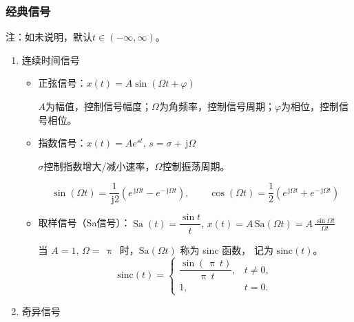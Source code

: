 \documentclass[UTF8,fontset=fandol,zihao=5]{ctexart}
\newcommand{\jj}{\,\mathrm{j}}
\newcommand{\ppi}{\,\uppi\,}
\begin{document}
\subsubsection{经典信号}

注：如未说明，默认$t \in \left ( -\infty, \infty \right )$。

\begin{enumerate}
    \item 连续时间信号
    \begin{itemize}
      \item 正弦信号：$x(t)=A\sin\left ( \varOmega t + \varphi \right )$
      
      $A$为幅值，控制信号幅度；$\varOmega$为角频率，控制信号周期；$\varphi$为相位，控制信号相位。

      \item 指数信号：$x(t)=Ae^{st}, \, s = \sigma + \jj \varOmega$
    
      $\sigma$控制指数增大/减小速率，$\varOmega$控制振荡周期。

      \begin{methodbox}[正弦信号与指数信号关系]
        \[
        \sin \left ( \varOmega t \right ) = \frac{1}{\jj 2} \left ( e^{\jj \varOmega t} - e^{-\jj \varOmega t} \right ), \qquad
        \cos \left ( \varOmega t \right ) = \frac{1}{2} \left ( e^{\jj \varOmega t} + e^{-\jj \varOmega t} \right )
        \]
      \end{methodbox}
    
      \item 取样信号（Sa信号）：$\operatorname{Sa}(t)=\dfrac{\sin t}{t}, \, \displaystyle x(t) = A \, \mathrm{Sa}(\varOmega t) = A \, \frac{\sin \varOmega t}{\varOmega t}$
      
      \begin{methodbox}[sinc函数]
        当 $A=1, \, \varOmega = \ppi$ 时，$\mathrm{Sa}(\varOmega t)$ 称为 sinc 函数，
        记为 $\mathrm{sinc}(t)$。
        \[
        \mathrm{sinc}(t)=
        \begin{cases}
        \dfrac{\sin(\ppi t)}{\ppi t}, & t\neq 0,\\[6pt]
        1, & t=0.
        \end{cases}
        \]
      \end{methodbox}
    \end{itemize}

    \item 奇异信号
    

\end{enumerate}
\end{document}
